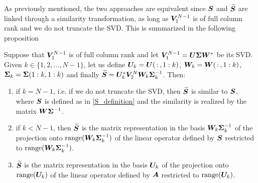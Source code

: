 As previously mentioned, the two approaches are equivalent since $\vb*{S}$ and $\widetilde{\vb*{S}}$ are linked through a similarity transformation, as long as $\vb*{V}_1^{N-1}$ is of full column rank and we do not truncate the SVD. This is summarized in the following proposition
\begin{prop}
\label{prop_svd_dmd}
Suppose that $\vb*{V}_1^{N-1}$ is of full column rank and let $\vb*{V}_1^{N-1} = \vb*{U}\vb*{\Sigma}\vb*{W}^{*}$ be its SVD. Given $k\in\{1,2,\dots, N-1\}$, let us define $\vb*{U}_k = \vb*{U}(\,:\,, 1:k)$, $\vb*{W}_k = \vb*{W}(\,:\,, 1:k)$, $\vb*{\Sigma}_k = \vb*{\Sigma}(1:k, 1:k)$ and finally $\widetilde{\vb*{S}} = \vb*{U}_k^*\vb*{V}_2^N\vb*{W}_k\vb*{\Sigma}_k^{-1}$. Then:
\begin{enumerate}[label=(\roman*)]
    \item if $k = N-1$, i.e. if we do not truncate the SVD, then $\widetilde{\vb*{S}}$ is similar to $\vb*{S}$, where $\vb*{S}$ is defined as in \eqref{S_definition} and the similarity is realized by the matrix $\vb*{W}\vb*{\Sigma}^{-1}$.
    \item if $k < N-1$, then $\widetilde{\vb*{S}}$ is the matrix representation in the basis $\vb*{W}_k\vb*{\Sigma}^{-1}_k$ of the projection onto $\mathrm{range}(\vb*{W}_k\vb*{\Sigma}^{-1}_k)$ of the linear operator defined by $\vb*{S}$ restricted to $\mathrm{range}(\vb*{W}_k\vb*{\Sigma}^{-1}_k)$.
    \item $\widetilde{\vb*{S}}$ is the matrix representation in the basis $\vb*{U}_k$ of the projection onto $\mathrm{range}(\vb*{U}_k)$ of the linear operator defined by $\vb*{A}$ restricted to $\mathrm{range}(\vb*{U}_k)$.
\end{enumerate}
\end{prop}
